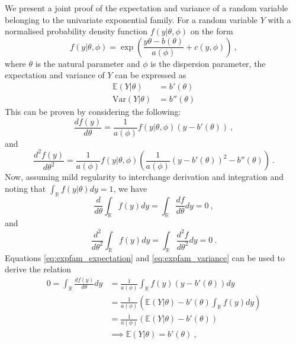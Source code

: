 We present a joint proof of the expectation and variance of a random variable belonging to the univariate exponential family.
For a random variable $Y$ with a normalised probability density function $f(y \lvert \theta, \phi)$ on the form
\begin{equation}
    f(y \lvert \theta, \phi) = \exp\left( \frac{y\theta - b(\theta)}{a(\phi)} + c(y, \phi) \right) \ ,
\end{equation}
where $\theta$ is the natural parameter and $\phi$ is the dispersion parameter, the expectation and variance of $Y$ can be expressed as
\begin{equation}
    \begin{aligned}
        \mathbb{E}(Y \lvert \theta) &= b'(\theta) \\
        \text{Var}(Y \lvert \theta) &= b''(\theta)
    \end{aligned}
\end{equation}
This can be proven by considering the following:
\begin{equation}
    \frac{d f(y)}{d\theta} = \frac{1}{a(\phi)} f(y \lvert \theta, \phi) (y-b'(\theta))  \ ,
\end{equation}
and 
\begin{equation}
    \frac{d^2 f(y)}{d\theta^2} = \frac{1}{a(\phi)}f(y \lvert \theta, \phi) \left( \frac{1}{a(\phi)}(y-b'(\theta))^2 - b''(\theta) \right) \ .
\end{equation}
Now, assuming mild regularity to interchange derivation and integration and noting that  $\int_{\mathbb{R}} f(y \lvert \theta) dy = 1$, we have 
\begin{equation}
    \label{eq:expfam_expectation}
    \frac{d}{d \theta} \int_{\mathbb{R}} f(y) dy  = \int_{\mathbb{R}} \frac{d f}{d\theta} dy = 0 \ ,
\end{equation}
and 
\begin{equation}
    \label{eq:expfam_variance}
    \frac{d^2}{d \theta^2} \int_{\mathbb{R}} f(y) dy = \int_{\mathbb{R}} \frac{d^2 f}{d\theta^2} dy = 0 \ .
\end{equation}
Equations \eqref{eq:expfam_expectation} and \eqref{eq:expfam_variance} can be used to derive the relation 
\begin{equation}
    \begin{aligned}
    0 = \int_{\mathbb{R}} \frac{d f(y)}{d\theta} dy &= \frac{1}{a(\phi)}\int_{\mathbb{R}} f(y) (y-b'(\theta)) dy \\
    & = \frac{1}{a(\phi)} \left(\mathbb{E}(Y \lvert \theta) - b'(\theta)\int_{\mathbb{R}}f(y)dy \right) \\
    & = \frac{1}{a(\phi)} \left( \mathbb{E}(Y \lvert \theta) - b'(\theta) \right) \\
    & \implies \mathbb{E}(Y \lvert \theta) = b'(\theta) \ ,
    \end{aligned}
\end{equation}

